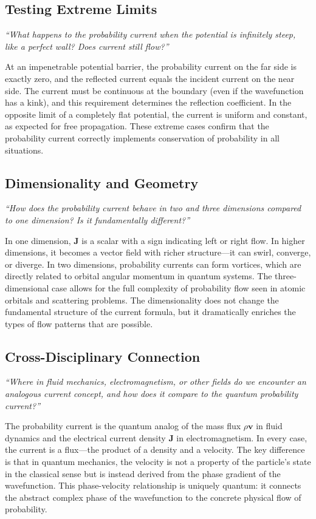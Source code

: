 \subsection*{Testing Extreme Limits}
\textit{``What happens to the probability current when the potential is infinitely steep, like a perfect wall? Does current still flow?''}

At an impenetrable potential barrier, the probability current on the far side is exactly zero, and the reflected current equals the incident current on the near side. The current must be continuous at the boundary (even if the wavefunction has a kink), and this requirement determines the reflection coefficient. In the opposite limit of a completely flat potential, the current is uniform and constant, as expected for free propagation. These extreme cases confirm that the probability current correctly implements conservation of probability in all situations.

\subsection*{Dimensionality and Geometry}
\textit{``How does the probability current behave in two and three dimensions compared to one dimension? Is it fundamentally different?''}

In one dimension, $\mathbf{J}$ is a scalar with a sign indicating left or right flow. In higher dimensions, it becomes a vector field with richer structure---it can swirl, converge, or diverge. In two dimensions, probability currents can form vortices, which are directly related to orbital angular momentum in quantum systems. The three-dimensional case allows for the full complexity of probability flow seen in atomic orbitals and scattering problems. The dimensionality does not change the fundamental structure of the current formula, but it dramatically enriches the types of flow patterns that are possible.

\subsection*{Cross-Disciplinary Connection}
\textit{``Where in fluid mechanics, electromagnetism, or other fields do we encounter an analogous current concept, and how does it compare to the quantum probability current?''}

The probability current is the quantum analog of the mass flux $\rho\mathbf{v}$ in fluid dynamics and the electrical current density $\mathbf{J}$ in electromagnetism. In every case, the current is a flux---the product of a density and a velocity. The key difference is that in quantum mechanics, the velocity is not a property of the particle's state in the classical sense but is instead derived from the phase gradient of the wavefunction. This phase-velocity relationship is uniquely quantum: it connects the abstract complex phase of the wavefunction to the concrete physical flow of probability.

